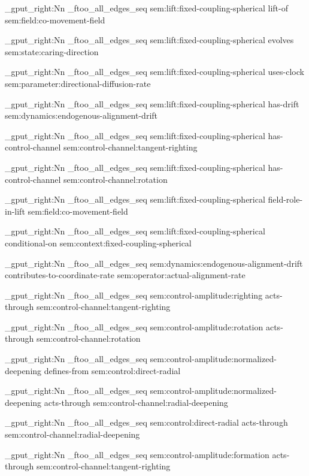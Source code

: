 \seq_gput_right:Nn \g_ftoo_all_edges_seq { { sem:lift:fixed-coupling-spherical } { lift-of } { sem:field:co-movement-field } }

\seq_gput_right:Nn \g_ftoo_all_edges_seq { { sem:lift:fixed-coupling-spherical } { evolves } { sem:state:caring-direction } }

\seq_gput_right:Nn \g_ftoo_all_edges_seq { { sem:lift:fixed-coupling-spherical } { uses-clock } { sem:parameter:directional-diffusion-rate } }

\seq_gput_right:Nn \g_ftoo_all_edges_seq { { sem:lift:fixed-coupling-spherical } { has-drift } { sem:dynamics:endogenous-alignment-drift } }

\seq_gput_right:Nn \g_ftoo_all_edges_seq { { sem:lift:fixed-coupling-spherical } { has-control-channel } { sem:control-channel:tangent-righting } }

\seq_gput_right:Nn \g_ftoo_all_edges_seq { { sem:lift:fixed-coupling-spherical } { has-control-channel } { sem:control-channel:rotation } }

\seq_gput_right:Nn \g_ftoo_all_edges_seq { { sem:lift:fixed-coupling-spherical } { field-role-in-lift } { sem:field:co-movement-field } }

\seq_gput_right:Nn \g_ftoo_all_edges_seq { { sem:lift:fixed-coupling-spherical } { conditional-on } { sem:context:fixed-coupling-spherical } }

\seq_gput_right:Nn \g_ftoo_all_edges_seq { { sem:dynamics:endogenous-alignment-drift } { contributes-to-coordinate-rate } { sem:operator:actual-alignment-rate } }

\seq_gput_right:Nn \g_ftoo_all_edges_seq { { sem:control-amplitude:righting } { acts-through } { sem:control-channel:tangent-righting } }

\seq_gput_right:Nn \g_ftoo_all_edges_seq { { sem:control-amplitude:rotation } { acts-through } { sem:control-channel:rotation } }

\seq_gput_right:Nn \g_ftoo_all_edges_seq { { sem:control-amplitude:normalized-deepening } { defines-from } { sem:control:direct-radial } }

\seq_gput_right:Nn \g_ftoo_all_edges_seq { { sem:control-amplitude:normalized-deepening } { acts-through } { sem:control-channel:radial-deepening } }

\seq_gput_right:Nn \g_ftoo_all_edges_seq { { sem:control:direct-radial } { acts-through } { sem:control-channel:radial-deepening } }

\seq_gput_right:Nn \g_ftoo_all_edges_seq { { sem:control-amplitude:formation } { acts-through } { sem:control-channel:tangent-righting } }

